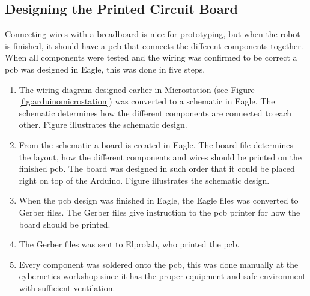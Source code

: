 \subsection{Designing the Printed Circuit Board}
Connecting wires with a breadboard is nice for prototyping, but when the robot is finished, it should have a \acrshort{pcb} that connects the different components together. When all components were tested and the wiring was confirmed to be correct a \acrshort{pcb} was designed in Eagle, this was done in five steps.
\begin{enumerate}[1.]
\item The wiring diagram designed earlier in Microstation (see Figure \ref{fig:arduinomicrostation}) was converted to a schematic in Eagle. The schematic determines how the different components are connected to each other. Figure 
illustrates the schematic design.
\item From the schematic a board is created in Eagle. The board file determines the layout, how the different components and wires should be printed on the finished \acrshort{pcb}. The board was designed in such order that it could be placed right on top of the Arduino. Figure 
illustrates the schematic design.
\item When the \acrshort{pcb} design was finished in Eagle, the Eagle files was converted to Gerber files. The Gerber files give instruction to the \acrshort{pcb} printer for how the board should be printed.
\item The Gerber files was sent to Elprolab, who printed the \acrshort{pcb}.
\item Every component was soldered onto the \acrshort{pcb}, this was done manually at the cybernetics workshop since it has the proper equipment and safe environment with sufficient ventilation.
\end{enumerate}